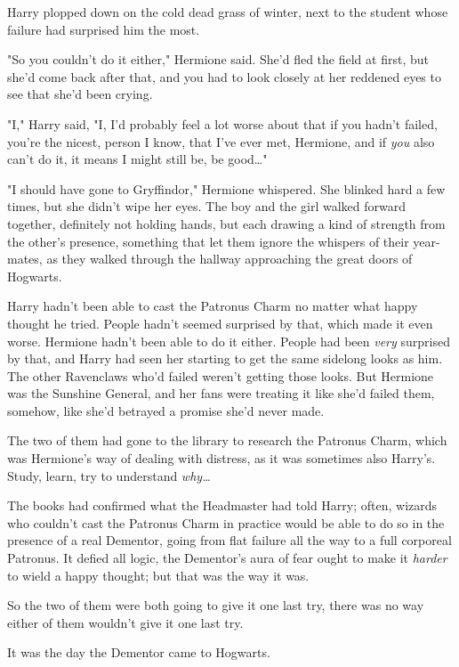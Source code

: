 Harry plopped down on the cold dead grass of winter, next to the student whose 
failure had surprised him the most.

"So you couldn't do it either," Hermione said. She'd fled the field at first, 
but she'd come back after that, and you had to look closely at her reddened 
eyes to see that she'd been crying.

"I," Harry said, "I, I'd probably feel a lot worse about that if you hadn't 
failed, you're the nicest, person I know, that I've ever met, Hermione, and if 
\emph{you} also can't do it, it means I might still be, be good{\ldots}"

"I should have gone to Gryffindor," Hermione whispered. She blinked hard a few 
times, but she didn't wipe her eyes.
\sbreak
The boy and the girl walked forward together, definitely not holding hands, but 
each drawing a kind of strength from the other's presence, something that let 
them ignore the whispers of their year-mates, as they walked through the 
hallway approaching the great doors of Hogwarts.

Harry hadn't been able to cast the Patronus Charm no matter what happy thought 
he tried. People hadn't seemed surprised by that, which made it even worse. 
Hermione hadn't been able to do it either. People had been \emph{very} 
surprised by that, and Harry had seen her starting to get the same sidelong 
looks as him. The other Ravenclaws who'd failed weren't getting those looks. 
But Hermione was the Sunshine General, and her fans were treating it like she'd 
failed them, somehow, like she'd betrayed a promise she'd never made.

The two of them had gone to the library to research the Patronus Charm, which 
was Hermione's way of dealing with distress, as it was sometimes also Harry's. 
Study, learn, try to understand \emph{why{\ldots}}

The books had confirmed what the Headmaster had told Harry; often, wizards who 
couldn't cast the Patronus Charm in practice would be able to do so in the 
presence of a real Dementor, going from flat failure all the way to a full 
corporeal Patronus. It defied all logic, the Dementor's aura of fear ought to 
make it \emph{harder} to wield a happy thought; but that was the way it was.

So the two of them were both going to give it one last try, there was no way 
either of them wouldn't give it one last try.

It was the day the Dementor came to Hogwarts.

